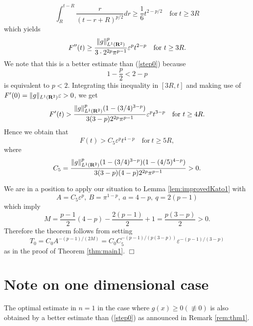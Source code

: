 \documentclass[a4paper,12pt]{article}
\numberwithin{equation}{section}
\def\R{{\bf R}}
\def\e{{\varepsilon}}
\begin{document}
\[
\int_R^{t-R}\frac{r}{(t-r+R)^{p/2}}dr
\ge\frac{1}{6}t^{2-p/2}\quad\mbox{for}\ t\ge3R
\]
which yields
\[
F''(t)\ge\frac{\|g\|^p_{L^1(\R^2)}}{3\cdot2^{2p}\pi^{p-1}}\e^pt^{2-p}
\quad\mbox{for}\ t\ge3R.
\]
We note that this is a better estimate than (\ref{step0}) because
\[
1-\frac{p}{2}<2-p
\]
is equivalent to $p<2$.
Integrating this inequality in $[3R,t]$
and making use of $F'(0)=\|g\|_{L^1(\R^2)}\e>0$, we get
\[
F'(t)>\frac{\|g\|^p_{L^1(\R^2)}(1-(3/4)^{3-p})}{3(3-p)2^{2p}\pi^{p-1}}\e^pt^{3-p}
\quad\mbox{for}\ t\ge4R.
\]
Hence we obtain that
\[
F(t)>C_5\e^pt^{4-p}
\quad\mbox{for}\ t\ge5R,
\]
where
\[
C_5=\frac{\|g\|^p_{L^1(\R^2)}(1-(3/4)^{3-p})(1-(4/5)^{4-p})}
{3(3-p)(4-p)2^{2p}\pi^{p-1}}>0.
\]
\par
We are in a position to apply our situation to Lemma \ref{lem:improvedKato1} with
\[
A=C_5\e^p,\ B=\pi^{1-p},\ a=4-p,\ q=2(p-1)
\]
which imply
\[
M=\frac{p-1}{2}(4-p)-\frac{2(p-1)}{2}+1=\frac{p(3-p)}{2}>0.
\] 
Therefore the theorem follows from setting
\[
T_0=C_0A^{-(p-1)/(2M)}=C_0C_5^{-(p-1)/(p(3-p))}\e^{-(p-1)/(3-p)}
\]
as in the proof of Theorem \ref{thm:main1}.
\hfill$\Box$


\section{Note on one dimensional case}
\label{section:1d}
The optimal estimate in $n=1$ in the case where $g(x)\ge0(\not\equiv0)$
is also obtained by a better estimate than (\ref{step0}) as announced in Remark \ref{rem:thm1}.
 
\end{document}
